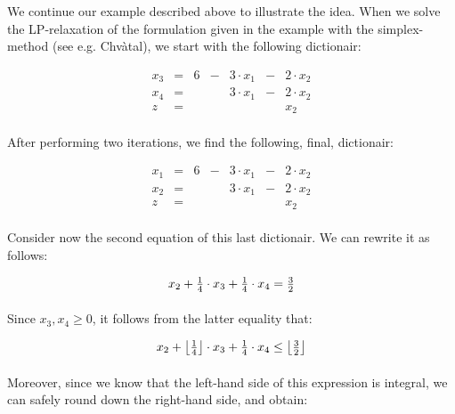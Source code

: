 \begin{example}
We continue our example described above to illustrate the idea. When we solve the LP-relaxation of the formulation given in the example with the simplex-method (see e.g. Chv\`atal\cite{Chvatal/83/Linear}), we start with the following dictionair:

\begin{equation}
\begin{array}{rcrcrcr}
x_3&=&6&-&3\cdot x_1&-&2\cdot x_2\\
x_4&=&&&3\cdot x_1&-&2\cdot x_2\\\hline
z&=&&&&&x_2
\end{array}
\end{equation}

\paragraph{}
After performing two iterations, we find the following, final, dictionair:

\begin{equation}
\begin{array}{rcrcrcr}
x_1&=&6&-&3\cdot x_1&-&2\cdot x_2\\
x_2&=&&&3\cdot x_1&-&2\cdot x_2\\\hline
z&=&&&&&x_2
\end{array}
\end{equation}

\paragraph{}
Consider now the second equation of this last dictionair. We can rewrite it as follows:

\begin{equation}
x_2+\tfrac{1}{4}\cdot x_3+\tfrac{1}{4}\cdot x_4=\tfrac{3}{2}\eqnlab{cg-cut-eq2-ini}
\end{equation}

\paragraph{}
Since $x_3,x_4\geq 0$, it follows from the latter equality that:

\begin{equation}
x_2+\left\lfloor \tfrac{1}{4} \right\rfloor\cdot x_3+\tfrac{1}{4}\cdot x_4\leq\left\lfloor \tfrac{3}{2} \right\rfloor
\end{equation}

\paragraph{}
Moreover, since we know that the left-hand side of this expression is integral, we can safely round down the right-hand side, and obtain:


\end{example}
